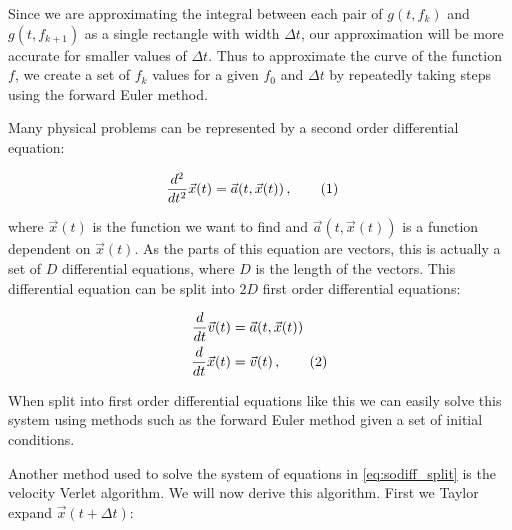 \documentclass[reprint,english,notitlepage]{revtex4-1}  %
\newcommand\numberthis{\addtocounter{equation}{1}\tag{\theequation}}
\begin{document}
Since we are approximating the integral between each pair of \(g(t, f_{k})\) and \(g(t, f_{k+1})\)  as a single rectangle with width \(\Delta t\), our approximation will be more accurate for smaller values of \(\Delta t\). Thus to approximate the curve of the function \(f\), we create a set of \(f_{k}\) values for a given \(f_{0}\) and \(\Delta t\) by repeatedly taking steps using the forward Euler method.

Many physical problems can be represented by a second order differential equation:

\begin{align*}
\frac{d^2}{dt^2} \vec{x}(t) &= \vec{a}(t,\vec{x}(t)) \, , \numberthis \label{eq:sodiff}
\end{align*}

where $\vec{x}(t)$ is the function we want to find and $\vec{a}(t,\vec{x}(t))$ is a function dependent on $\vec{x}(t)$. As the parts of this equation are vectors, this is actually a set of $D$ differential equations, where $D$ is the length of the vectors. This differential equation can be split into $2D$ first order differential equations:

\begin{align*}
\frac{d}{dt} \vec{v}(t) &= \vec{a}(t,\vec{x}(t))  \\
\frac{d}{dt} \vec{x}(t) &= \vec{v}(t) \, , \numberthis \label{eq:sodiff_split}
\end{align*}

When split into first order differential equations like this we can easily solve this system using methods such as the forward Euler method given a set of initial conditions.




Another method used to solve the system of equations in \eqref{eq:sodiff_split} is the velocity Verlet algorithm. We will now derive this algorithm. First we Taylor expand $\vec{x}(t + \Delta t)$:
\end{document}
